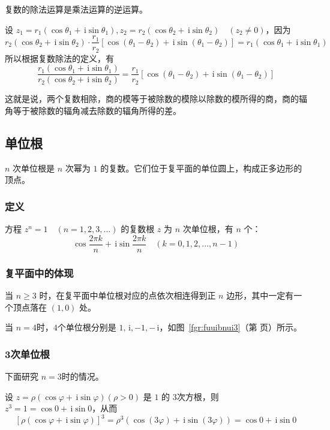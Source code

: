 \documentclass[a4paper,openany]{ctexbook}
\newcommand{\ii}{\,\mathrm{i}}
\begin{document}
复数的除法运算是乘法运算的逆运算。

设 \(z_1=r_1(\cos \theta_1 + \,\mathrm{i} \sin \theta _1),z_2=r_2
(\cos \theta_2 + \,\mathrm{i} \sin \theta _2)\quad (z_2 \ne 0)\)，因为
\[
    r_2(\cos \theta_2 + \,\mathrm{i} \sin \theta _2)\cdot\frac{r_1}{r_2}[\cos (\theta _1-\theta _2)+
        \ii \sin (\theta _1-\theta _2)]=r_1(\cos \theta_1 + \,\mathrm{i} \sin \theta _1)
\]
所以根据复数除法的定义，有
\[
    \boxed{
        \frac{r_1(\cos \theta_1 + \,\mathrm{i} \sin \theta _1)}{r_2(\cos \theta_2 + \,\mathrm{i} \sin \theta _2)}=\frac{r_1}{r_2}[\cos (\theta _1-\theta _2)+
            \ii \sin (\theta _1-\theta _2)]
    }
\]

这就是说，两个复数相除，商的模等于被除数的模除以除数的模所得的商，商的辐角等于被除数的辐角减去除数的辐角所得的差。

\subsection{单位根}

\(n\) 次单位根是 \(n\) 次幂为 \(1\) 的复数。它们位于复平面的单位圆上，构成正多边形的顶点。

\subsubsection{定义}

方程 \(z^n=1\quad (n=1,2,3,\dots)\) 的复数根 \(z\) 为 \(n\) 次单位根，有 \(n\) 个：
\[\cos \frac{2 \pi k}{n}+\,\mathrm{i} \sin \frac{2 \pi k}{n}\quad (k=0,1,2,\dots,n-1)\]

\subsubsection{复平面中的体现}

当 \(n \ge 3\) 时，在复平面中单位根对应的点依次相连得到正 \(n\) 边形，其中一定有一个顶点落在 \((1,0)\) 处。

当 \(n=4\)时，\(4\)个单位根分别是 \(1,\ii,-1,-\ii\)，如图~\ref{fgr:fuuibnui3}（第 \pageref{fgr:fuuibnui3} 页）所示。

\subsubsection{3次单位根}

下面研究 \(n=3\)时的情况。

设 \(z= \rho (\cos \varphi +\ii \sin \varphi )(\rho >0)\) 是 \(1\) 的 \(3\)次方根，则 \(z^3=1=\cos 0+\ii \sin 0\)，从而
\[
    [\rho (\cos \varphi +\ii \sin \varphi )]^3=\rho ^3(\cos (3 \varphi )+\ii \sin (3 \varphi ))=\cos 0+\ii \sin 0
\]
\end{document}
